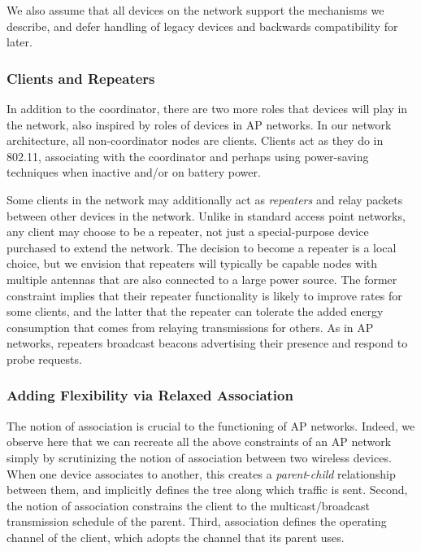 We also assume that all devices on the network support the mechanisms we describe, and defer handling of legacy devices and backwards compatibility for later.

\subsubsection{Clients and Repeaters}
\label{sec:client_repeater}
In addition to the coordinator, there are two more roles that devices will play in the network, also inspired by roles of devices in AP networks. In our network architecture, all non-coordinator nodes are clients. Clients act as they do in 802.11, associating with the coordinator and perhaps using power-saving techniques when inactive and/or on battery power.

Some clients in the network may additionally act as \emph{repeaters} and relay packets between other devices in the network. Unlike in standard access point networks, any client may choose to be a repeater, not just a special-purpose device purchased to extend the network. The decision to become a repeater is a local choice, but we envision that repeaters will typically be capable nodes with multiple antennas that are also connected to a large power source. The former constraint implies that their repeater functionality is likely to improve rates for some clients, and the latter that the repeater can tolerate the added energy consumption that comes from relaying transmissions for others. As in AP networks, repeaters broadcast beacons advertising their presence and respond to probe requests.

\subsubsection{Adding Flexibility via Relaxed Association}
\label{sec:flexible}
The notion of association is crucial to the functioning of AP networks. Indeed, we observe here that we can recreate all the above constraints of an AP network simply by scrutinizing the notion of association between two wireless devices. When one device associates to another, this creates a \emph{parent}-\emph{child} relationship between them, and implicitly defines the tree along which traffic is sent. Second, the notion of association constrains the client to the multicast/broadcast transmission schedule of the parent. Third, association defines the operating channel of the client, which adopts the channel that its parent uses.

